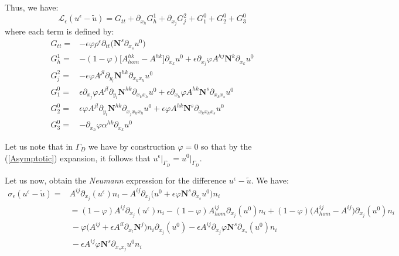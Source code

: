 Thus, we have:
\begin{equation}
    \mathcal{L}_{\epsilon} (u^{\epsilon}-\tilde{u}) = G_{tt} + \partial_{x_h} G_h^1 + \partial_{x_j} G_j^2 + G_1^0 + G_2^0 + G_3^0
\end{equation}
where each term is defined by:
\begin{equation}
    \label{Variables}
    \begin{array}{cc}
        G_{tt}= & -\epsilon \varphi \rho^{\epsilon} \partial_{tt} \big( \mathbf{N}^s \partial_{x_s} u^0 \big) \\
        G_h^1= &-(1-\varphi) \big[ A^{hk}_{hom} - A^{hk}\big] \partial_{x_k} u^0 + \epsilon \partial_{x_j}\varphi A^{hj} \mathbf{N}^k \partial_{x_k} u^0 \\
        G_j^2 = & -\epsilon \varphi A^{jl}\partial_{y_l} \mathbf{N}^{hk} \partial_{x_k x_h} u^0 \\
        G_1^0 = & \epsilon \partial_{x_j} \varphi A^{jl} \partial_{y_l} \mathbf{N}^{hk} \partial_{x_k x_h} u^0 + \epsilon \partial_{x_h} \varphi A^{hk} \mathbf{N}^s \partial_{x_k x_s} u^0 \\
        G_2^0 = & \epsilon \varphi A^{jl} \partial_{y_l} \mathbf{N}^{hk} \partial_{x_j x_k x_h} u^0 + \epsilon \varphi A^{hk} \mathbf{N}^s \partial_{x_k x_h x_s} u^0 \\
        G_3^0 = & - \partial_{x_h} \varphi \alpha^{hk} \partial_{x_k} u^0
    \end{array}
\end{equation}
\begin{rem}
Let us note that in $\Gamma_D$ we have by construction $\varphi = 0$ so that by the (\ref{Asymptotic}) expansion, it follows that $u^{\epsilon}\vert_{\Gamma_D} = u^0 \vert_{\Gamma_D}$.
\end{rem}
Let us now, obtain the \textit{Neumann} expression for the difference $u^{\epsilon} - \tilde{u}$. We have:
\begin{align*}
    \sigma_{\epsilon} (u^{\epsilon} - \tilde{u}) =& A^{ij} \partial_{x_j} (u^{\epsilon}) n_i - A^{ij} \partial_{x_j} \big( u^0 + \epsilon \varphi \mathbf{N}^s \partial_{x_s}u^0\big) n_i \\
    &= (1-\varphi) A^{ij} \partial_{x_j} (u^{\epsilon})n_i - (1-\varphi) A^{ij}_{hom} \partial_{x_j} (u^0) n_i + (1-\varphi) \big( A^{ij}_{hom} - A^{ij} \big) \partial_{x_j} (u^0)n_i \\
    &\, - \varphi \big( A^{ij} + \epsilon A^{il} \partial_{x_l} \mathbf{N}^j \big) n_i \partial_{x_j}(u^0) - \epsilon A^{ij} \partial_{x_j}\varphi \mathbf{N}^s \partial_{x_s}(u^0) n_i \\
    &\, - \epsilon A^{ij} \varphi \mathbf{N}^s \partial_{x_s x_j} u^0 n_i 
\end{align*}
